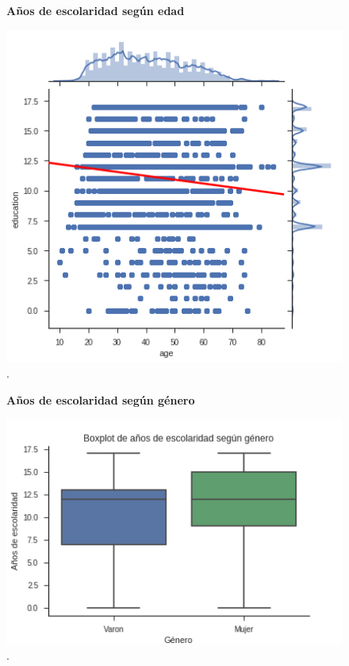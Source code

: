     \begin{figure}[!htb]
    	\centering
    	\textbf{Años de escolaridad según edad}\par\medskip
    	\includegraphics[scale = 0.4]{../img/capitulo3/educVage.png}
    	\caption{.}
    	\label{fig:educVage}
    \end{figure}

    \begin{figure}[!htb]
    	\centering
    	\textbf{Años de escolaridad según género}\par\medskip
    	\includegraphics[scale = 0.4]{../img/capitulo3/educVgenero.png}
    	\caption{.}
    	\label{fig:educVgenero}
    \end{figure}
    
     
